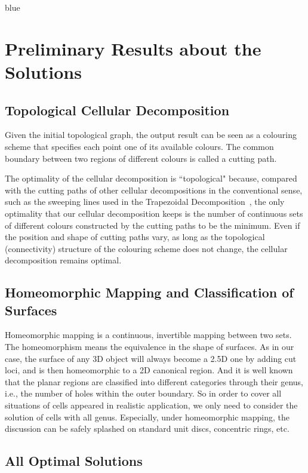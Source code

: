 \documentclass[Afour,sageh,times]{sagej}
\begin{document}
\begin{color}{blue}
\section{Preliminary Results about the Solutions}\label{section_preliminary}\label{section_simply_connected}
\subsection{Topological Cellular Decomposition}
Given the initial topological graph, the output result can be seen as a colouring scheme that specifies each point one of its available colours. The common boundary between two regions of different colours is called a cutting path. 

The optimality of the cellular decomposition is ``topological" because, compared with the cutting paths of other cellular decompositions in the conventional sense, such as the sweeping lines used in the Trapezoidal Decomposition~\cite{Seidel1991Simple}, the only optimality that our cellular decomposition keeps is the number of continuous sets of different colours constructed by the cutting paths to be the minimum. 
Even if the position and shape of cutting paths vary, as long as the topological (connectivity) structure of the colouring scheme does not change, the cellular decomposition remains optimal. 


\subsection{Homeomorphic Mapping and Classification of Surfaces}
\noindent
\indent
Homeomorphic mapping is a continuous, invertible mapping between two sets. The homeomorphism means the equivalence in the shape of surfaces. As in our case, the surface of any 3D object will always become a 2.5D one by adding cut loci, and is then homeomorphic to a 2D canonical region. And it is well known~\cite{Simmons1964Introduction} that the planar regions are classified into different categories through their genus, i.e., the number of holes within the outer boundary. So in order to cover all situations of cells appeared in realistic application, we only need to consider the solution of cells with all genus. Especially, under homeomorphic mapping, the discussion can be safely splashed on standard unit discs, concentric rings, etc.  

\subsection{All Optimal Solutions}
\noindent
\indent


\end{color}
\end{document}
